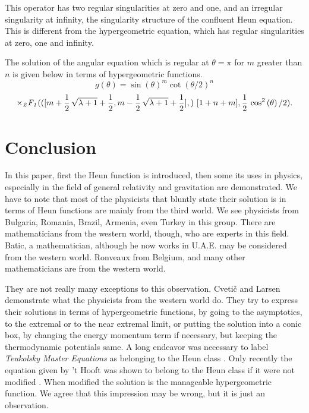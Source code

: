 \documentclass{article}
\begin{document}
\noindent This operator has two regular singularities at zero and
one, and an irregular singularity at infinity, the singularity
structure of the confluent Heun equation. This is different from
the hypergeometric equation, which has regular singularities at
zero, one and infinity.

\qquad \noindent The  solution of the angular  equation which is
regular at $\theta = \pi$  for $m$ greater than $n$ is given below
in terms of hypergeometric functions.
\begin{equation*}
g(\theta) = \sin(\theta)^{m} \cot(\theta/2)^{n}
\end{equation*}%
\begin{equation*}
\times {\mathit{_{2}F_{1}}(([m+{\frac{{1}}{{2}}}\,\sqrt{\lambda +1}+{\frac{{1}%
}{{2}}},m-{\frac{{1}}{{2}}}\,\sqrt{\lambda +1}+{\frac{{1}}{{2}}}],)\ {%
[1+n+m],{\frac{{1}}{{2}}}\,\cos^2 \left( \theta \right)/2 })}.
\end{equation*}

\section {Conclusion}

\noindent In this paper, first the  Heun function is introduced, then some its uses in physics, especially in the field
 of general relativity and gravitation are demonstrated.  We have to note that most of the physicists that bluntly state their solution
 is in terms of Heun functions  are mainly from the third world. We see physicists from Bulgaria, Romania, Brazil, Armenia, even Turkey in this group. There are mathematicians from the western world, though, who are experts in this field. 
  Batic, a mathematician, although he now works in U.A.E. may be considered from  the western world.   Ronveaux from Belgium, and many other mathematicians are from the western world. 
  
  
They are not really many exceptions to this observation. Cveti\v{c} and
Larsen demonstrate what the physicists from the western world do.
They try to express their solutions in terms of hypergeometric
functions, by going to the asymptotics, to the extremal or to the
near extremal limit, or putting the solution into a conic box, by
changing the energy momentum term if necessary, but keeping the
thermodynamic potentials same. A long endeavor was necessary to
label  \emph{Teukolsky Master Equations} as belonging to the Heun
class \cite{batic13}. Only recently the equation given by 't Hooft
\cite{Hooft} was shown to belong to the Heun class if it were not
modified \cite{Tolga23}.  When modified the solution is the
manageable
 hypergeometric function.
We agree that this  impression may be wrong, but it is just an
observation.
\end{document}
